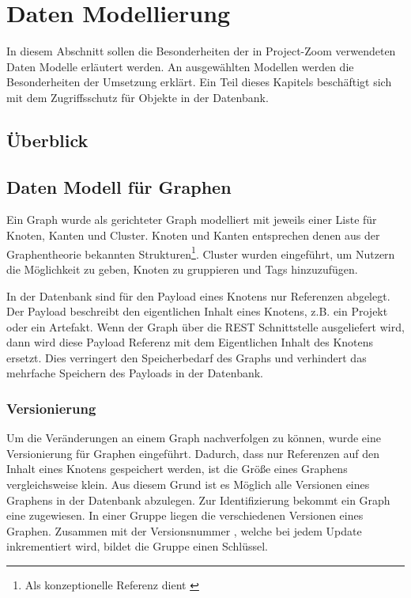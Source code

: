 \chapter{Daten Modellierung}
\label{sec:model}
In diesem Abschnitt sollen die Besonderheiten der in Project-Zoom verwendeten Daten Modelle erläutert werden. An ausgewählten Modellen werden die Besonderheiten der Umsetzung erklärt. Ein Teil dieses Kapitels beschäftigt sich mit dem Zugriffsschutz für Objekte in der Datenbank.

\section{Überblick}

\section{Daten Modell für Graphen}
Ein Graph wurde als gerichteter Graph modelliert mit jeweils einer Liste für Knoten, Kanten und Cluster. Knoten und Kanten entsprechen denen aus der Graphentheorie bekannten Strukturen\footnote{Als konzeptionelle Referenz dient \cite[p.~531]{corman}}.  Cluster wurden eingeführt, um Nutzern die Möglichkeit zu geben, Knoten zu gruppieren und Tags hinzuzufügen.

In der Datenbank sind für den Payload eines Knotens nur Referenzen abgelegt. Der Payload beschreibt den eigentlichen Inhalt eines Knotens, z.B. ein Projekt oder ein Artefakt. Wenn der Graph über die REST Schnittstelle ausgeliefert wird, dann wird diese Payload Referenz mit dem Eigentlichen Inhalt des Knotens ersetzt. Dies verringert den Speicherbedarf des Graphs und verhindert das mehrfache Speichern des Payloads in der Datenbank.

\subsection{Versionierung}

Um die Veränderungen an einem Graph nachverfolgen zu können, wurde eine Versionierung für Graphen eingeführt. Dadurch, dass nur Referenzen auf den Inhalt eines Knotens gespeichert werden, ist die Größe eines Graphens vergleichsweise klein. Aus diesem Grund ist es Möglich alle Versionen eines Graphens in der Datenbank abzulegen. Zur Identifizierung bekommt ein Graph eine  zugewiesen. In einer Gruppe liegen die verschiedenen Versionen eines Graphen. Zusammen mit der Versionsnummer , welche bei jedem Update inkrementiert wird, bildet die Gruppe einen Schlüssel.

